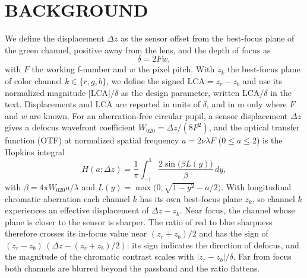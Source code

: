 \documentclass{ieee-ojvt}
\begin{document}
\section{BACKGROUND}
We define the displacement $\Delta z$ as the sensor offset from the best-focus plane of the green channel, positive away from the lens, and the depth of focus as
\begin{equation}
\delta = 2 F w,
\end{equation}
with $F$ the working f-number and $w$ the pixel pitch. With $z_k$ the best-focus plane of color channel $k\in\{r,g,b\}$, we define the signed $\mathrm{LCA}=z_r-z_b$ and use its normalized magnitude $|\mathrm{LCA}|/\delta$ as the design parameter, written LCA/$\delta$ in the text. Displacements and LCA are reported in units of $\delta$, and in \textmu m only where $F$ and $w$ are known.
For an aberration-free circular pupil, a sensor displacement $\Delta z$ gives a defocus wavefront coefficient $W_{020}=\Delta z/(8F^2)$, and the optical transfer function (OTF) at normalized spatial frequency $a=2\nu\lambda F$ ($0\le a\le 2$) is the Hopkins integral \cite{hopkins1955defocus,stokseth1969defocused}
\begin{equation}
H(a;\Delta z)=\frac{1}{\pi}\int_{-1}^{1}\frac{2\sin\!\bigl(\beta L(y)\bigr)}{\beta}\,dy,
\label{eq:otf}
\end{equation}
with $\beta=4\pi W_{020}a/\lambda$ and $L(y)=\max\bigl(0,\sqrt{1-y^2}-a/2\bigr)$.
With longitudinal chromatic aberration each channel $k$ has its own best-focus plane $z_k$, so channel $k$ experiences an effective displacement of $\Delta z-z_k$. Near focus, the channel whose plane is closer to the sensor is sharper. The ratio of red to blue sharpness therefore crosses its in-focus value near $(z_r+z_b)/2$ and has the sign of $(z_r-z_b)\,(\Delta z-(z_r+z_b)/2)$: its sign indicates the direction of defocus, and the magnitude of the chromatic contrast scales with $|z_r-z_b|/\delta$. Far from focus both channels are blurred beyond the passband and the ratio flattens.
\end{document}
